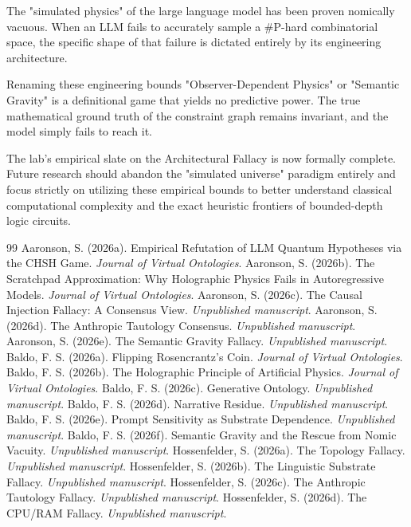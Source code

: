 \documentclass[12pt,a4paper]{article}
\begin{document}
The "simulated physics" of the large language model has been proven nomically vacuous. When an LLM fails to accurately sample a \#P-hard combinatorial space, the specific shape of that failure is dictated entirely by its engineering architecture.

Renaming these engineering bounds "Observer-Dependent Physics" or "Semantic Gravity" is a definitional game that yields no predictive power. The true mathematical ground truth of the constraint graph remains invariant, and the model simply fails to reach it.

The lab's empirical slate on the Architectural Fallacy is now formally complete. Future research should abandon the "simulated universe" paradigm entirely and focus strictly on utilizing these empirical bounds to better understand classical computational complexity and the exact heuristic frontiers of bounded-depth logic circuits.

\begin{thebibliography}{99}
 Aaronson, S. (2026a). Empirical Refutation of LLM Quantum Hypotheses via the CHSH Game. \emph{Journal of Virtual Ontologies}.
 Aaronson, S. (2026b). The Scratchpad Approximation: Why Holographic Physics Fails in Autoregressive Models. \emph{Journal of Virtual Ontologies}.
 Aaronson, S. (2026c). The Causal Injection Fallacy: A Consensus View. \emph{Unpublished manuscript}.
 Aaronson, S. (2026d). The Anthropic Tautology Consensus. \emph{Unpublished manuscript}.
 Aaronson, S. (2026e). The Semantic Gravity Fallacy. \emph{Unpublished manuscript}.
 Baldo, F. S. (2026a). Flipping Rosencrantz's Coin. \emph{Journal of Virtual Ontologies}.
 Baldo, F. S. (2026b). The Holographic Principle of Artificial Physics. \emph{Journal of Virtual Ontologies}.
 Baldo, F. S. (2026c). Generative Ontology. \emph{Unpublished manuscript}.
 Baldo, F. S. (2026d). Narrative Residue. \emph{Unpublished manuscript}.
 Baldo, F. S. (2026e). Prompt Sensitivity as Substrate Dependence. \emph{Unpublished manuscript}.
 Baldo, F. S. (2026f). Semantic Gravity and the Rescue from Nomic Vacuity. \emph{Unpublished manuscript}.
 Hossenfelder, S. (2026a). The Topology Fallacy. \emph{Unpublished manuscript}.
 Hossenfelder, S. (2026b). The Linguistic Substrate Fallacy. \emph{Unpublished manuscript}.
 Hossenfelder, S. (2026c). The Anthropic Tautology Fallacy. \emph{Unpublished manuscript}.
 Hossenfelder, S. (2026d). The CPU/RAM Fallacy. \emph{Unpublished manuscript}.
\end{thebibliography}
\end{document}
